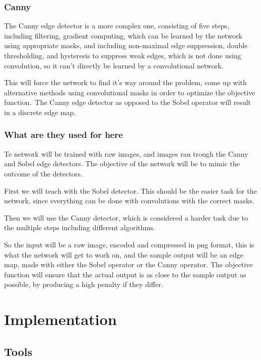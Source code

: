 \documentclass[a4paper]{article}
\begin{document}
\subsubsection{Canny}
The Canny edge detector is a more complex one, consisting of five steps, including filtering, gradient computing, which can be learned by the network using appropriate masks, and including non-maximal edge suppression, double thresholding, and hysteresis to suppress weak edges, which is not done using convolution, so it can't directly be learned by a convolutional network.\par
This will force the network to find it's way around the problem, come up with alternative methods using convolutional masks in order to optimize the objective function.\
The Canny edge detector as opposed to the Sobel operator will result in a discrete edge map.
\subsubsection{What are they used for here}
Te network will be trained with raw images, and images ran trough the Canny and Sobel edge detectors. The objective of the network will be to mimic the outcome of the detectors.\par
First we will teach with the Sobel detector. This should be the easier task for the network, since everything can be done with convolutions with the correct masks.\par
Then we will use the Canny detector, which is considered a harder task due to the multiple steps including different algorithms.\par
So the input will be a raw image, encoded and compressed in png format, this is what the network will get to work on, and the sample output will be an edge map, made with either the Sobel operator or the Canny operator. The objective function will ensure that the actual output is as close to the sample output as possible, by producing a high penalty if they differ.
\newpage
\section{Implementation}
\subsection{Tools}
\end{document}
